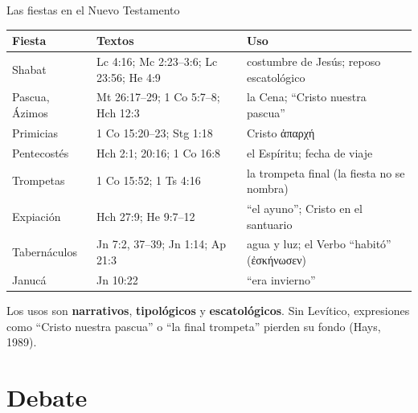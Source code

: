 \documentclass[hyperref={bookmarks=false},aspectratio=169]{beamer}
\newcommand{\grc}[1]{\foreignlanguage{ancientgreek}{#1}}
\newcommand{\destacar}[1]{\textbf{\textcolor{tierraroja}{#1}}}
\begin{document}
\begin{frame}{Las fiestas en el Nuevo Testamento}
\scriptsize\renewcommand{\arraystretch}{1.08}
\begin{tabular}{@{}L{2.2cm}L{4.4cm}L{5.2cm}@{}}
\toprule
\textbf{Fiesta} & \textbf{Textos} & \textbf{Uso} \\ \midrule
Shabat & Lc 4:16; Mc 2:23--3:6; Lc 23:56; He 4:9 & costumbre de Jesús; reposo escatológico \\
Pascua, Ázimos & Mt 26:17--29; 1 Co 5:7--8; Hch 12:3 & la Cena; ``Cristo nuestra pascua'' \\
Primicias & 1 Co 15:20--23; Stg 1:18 & Cristo \grc{ἀπαρχή} \\
Pentecostés & Hch 2:1; 20:16; 1 Co 16:8 & el Espíritu; fecha de viaje \\
Trompetas & 1 Co 15:52; 1 Ts 4:16 & la trompeta final (la fiesta no se nombra) \\
Expiación & Hch 27:9; He 9:7--12 & ``el ayuno''; Cristo en el santuario \\
Tabernáculos & Jn 7:2, 37--39; Jn 1:14; Ap 21:3 & agua y luz; el Verbo ``habitó'' (\grc{ἐσκήνωσεν}) \\
Janucá & Jn 10:22 & ``era invierno'' \\
\bottomrule
\end{tabular}\par\smallskip
\small Los usos son \destacar{narrativos}, \destacar{tipológicos} y \destacar{escatológicos}. Sin Levítico, expresiones como ``Cristo nuestra pascua'' o ``la final trompeta'' pierden su fondo (Hays, 1989).
\end{frame}

\section{Debate}
\end{document}
